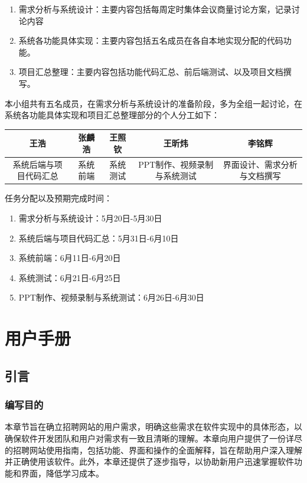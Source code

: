 \documentclass[UTF8,a4paper,10pt]{ctexart}
\begin{document}
\begin{enumerate}
    \item 需求分析与系统设计：主要内容包括每周定时集体会议商量讨论方案，记录讨论内容
    \item 系统各功能具体实现：主要内容包括五名成员在各自本地实现分配的代码功能。
    \item 项目汇总整理：主要内容包括功能代码汇总、前后端测试、以及项目文档撰写。
\end{enumerate}

本小组共有五名成员，在需求分析与系统设计的准备阶段，多为全组一起讨论，在系统各功能具体实现和项目汇总整理部分的个人分工如下：

\begin{tabular}{|c|c|c|c|c|}
\hline
\textbf{王浩} & \textbf{张麟浩} & \textbf{王照钦} & \textbf{王昕炜} & \textbf{李铭辉} \\
\hline
系统后端与项目代码汇总 & 系统前端 & 系统测试 & PPT制作、视频录制与系统测试 & 界面设计、需求分析与文档撰写 \\
\hline
\end{tabular}

任务分配以及预期完成时间：
\begin{enumerate}
    \item 需求分析与系统设计：5月20日-5月30日
    \item 系统后端与项目代码汇总：5月31日-6月10日
    \item 系统前端：6月11日-6月20日
    \item 系统测试：6月21日-6月25日
    \item PPT制作、视频录制与系统测试：6月26日-6月30日
\end{enumerate}

\section{用户手册}

\subsection{引言}

\subsubsection{编写目的}

本章节旨在确立招聘网站的用户需求，明确这些需求在软件实现中的具体形态，以确保软件开发团队和用户对需求有一致且清晰的理解。本章向用户提供了一份详尽的招聘网站使用指南，包括功能、界面和操作的全面解释，旨在帮助用户深入理解并正确使用该软件。此外，本章还提供了逐步指导，以协助新用户迅速掌握软件功能和界面，降低学习成本。
\end{document}
